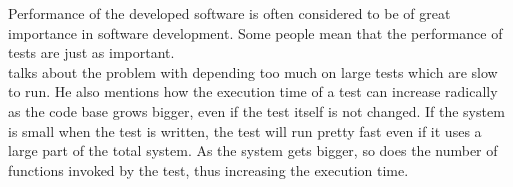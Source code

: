 
Performance of the developed software is often considered to be of great
importance in software development. Some people mean that the
performance of tests are just as important.\\

\citet{video:fast_slow_test} talks about the problem with depending too
much on large tests which are slow to run. He also mentions how the
execution time of a test can increase radically as the code base grows
bigger, even if the test itself is not changed. If the system is small
when the test is written, the test will run pretty fast even if it uses
a large part of the total system. As the system gets bigger, so does the
number of functions invoked by the test, thus increasing the execution
time.\\

